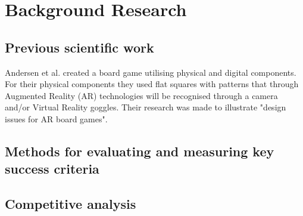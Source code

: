 \chapter{Background Research}\label{ch:bgres}

\section{Previous scientific work}
Andersen et al. \citep{andersen_designing_2004} created a board game utilising physical and digital components. For their physical components they used flat squares with patterns that through Augmented Reality (AR) technologies will be recognised through a camera and/or Virtual Reality goggles. Their research was made to illustrate "design issues for AR board games".

\section{Methods for evaluating and measuring key success criteria}

\section{Competitive analysis}
